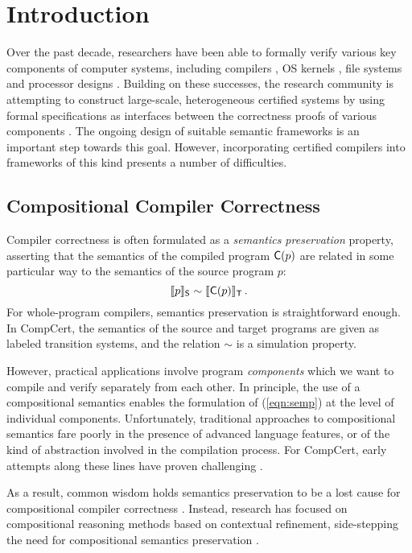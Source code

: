 \section{Introduction}
\label{sec:intro}

Over the past decade, researchers have been able to formally verify
various key components of computer systems, including compilers
\cite{compcert,cakeml,vellvm}, OS kernels
\cite{sel4,popl15,osdi16}, file systems \cite{fscq} and processor
designs \cite{safe,kami}.  Building on these successes, the research
community is attempting to construct large-scale, heterogeneous
certified systems by using formal specifications as interfaces between
the correctness proofs of various components \cite{deepspec}.  The
ongoing design of suitable semantic frameworks is an important step
towards this goal.  However, incorporating certified compilers into
frameworks of this kind presents a number of difficulties.

\subsection{Compositional Compiler Correctness} %

Compiler correctness is often formulated as a
\emph{semantics preservation} property,
asserting that the semantics
of the compiled program $ \mathsf{C} (p)$
are related in some particular way
to the semantics
of the source program $p$:
\begin{equation} \label{eqn:semp}
  \llbracket p \rrbracket_{ \mathsf{S} } \sim
  \llbracket  \mathsf{C} (p) \rrbracket_{ \mathsf{T} }
  \,.
\end{equation}
For whole-program compilers,
semantics preservation is straightforward enough.
In CompCert,
the semantics of the source and target programs
are given as labeled transition systems,
and the relation $\sim$ is a simulation property.

However,
practical applications involve
program \emph{components} which we want to compile
and verify separately from each other.
In principle,
the use of a compositional semantics
enables the formulation of (\ref{eqn:semp})
at the level of individual components.
Unfortunately, traditional approaches to compositional semantics
fare poorly in the presence of advanced language features,
or of the kind of abstraction
involved in the compilation process.
For CompCert,
early attempts along these lines
have proven
challenging \cite{cpp15,compcompcert}.

As a result,
common wisdom holds semantics preservation
to be a lost cause
for compositional compiler correctness \cite{next700}.
Instead,
research has focused on
compositional reasoning methods
based on contextual refinement,
side-stepping the need for compositional semantics preservation
\cite{sepcompcert,compcertm}.

